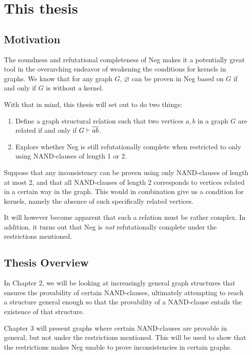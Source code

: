 \section{This thesis}
\label{sec:This thesis}
\subsection{Motivation}
\label{sub:Motivation}
The soundness and refutational completeness of Neg makes it a potentially great tool in the overarching endeavor of weakening the conditions for kernels in graphs.
We know that for any graph $G$, $\varnothing$ can be proven in Neg based on $G$ if and only if $G$ is without a kernel.

With that in mind, this thesis will set out to do two things:
\begin{enumerate}
  \item Define a graph structural relation such that two vertices $a,b$ in a graph $G$ are related if and only if $G \vdash \ol{ab}$.
  \item Explore whether Neg is still refutationally complete when restricted to only using NAND-clauses of length 1 or 2.
\end{enumerate}
Suppose that any inconsistency can be proven using only NAND-clauses of length at most 2, and that all NAND-clauses of length 2 corresponds to vertices related in a certain way in the graph.
This would in combination give us a condition for kernels, namely the absence of such specifically related vertices.

It will however become apparent that such a relation must be rather complex.
In addition, it turns out that Neg is \textit{not} refutationally complete under the restrictions mentioned.
\subsection{Thesis Overview}
\label{sub:Thesis Overview}
In Chapter 2, we will be looking at increasingly general graph structures that ensures the provability of certain NAND-clauses, ultimately attempting to reach a structure general enough so that the provability of a NAND-clause entails the existence of that structure.

Chapter 3 will present graphs where certain NAND-clauses are provable in general, but not under the restrictions mentioned.
This will be used to show that the restrictions makes Neg unable to prove inconsistencies in certain graphs.
